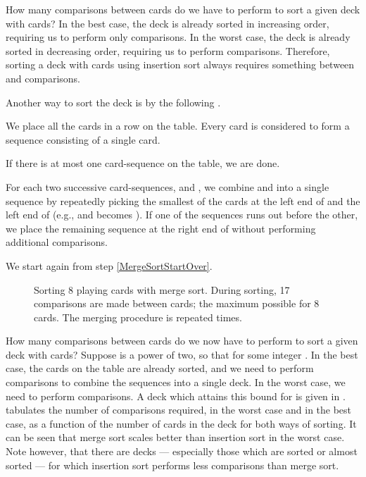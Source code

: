 \documentclass[b5paper, english, oneside]{memoir}
\begin{document}
How many comparisons between cards do we have to perform to sort a given deck with  cards? In the best case, the deck is already sorted in increasing order, requiring us to perform only  comparisons. In the worst case, the deck is already sorted in decreasing order, requiring us to perform  comparisons. Therefore, sorting a deck with  cards using insertion sort always requires something between  and  comparisons.

Another way to sort the deck is by the following .

\begin{enumbox}
\item We place all the cards in a row on the table. Every card  is considered to form a sequence  consisting of a single card.
\item \label{MergeSortStartOver} If there is at most one card-sequence on the table, we are done.
\item For each two successive card-sequences,  and , we combine  and  into a single sequence  by repeatedly picking the smallest of the cards at the left end of  and the left end of  (e.g.,  and  becomes ). If one of the sequences runs out before the other, we place the remaining sequence at the right end of  without performing additional comparisons.
\item We start again from step \ref{MergeSortStartOver}.
\end{enumbox}

\begin{figure}
\centering
\hfill{}\hfill\null

\hfill{}\hfill\null

\hfill{}\hfill\null

\hfill{}\hfill\null
\caption{Sorting 8 playing cards with merge sort. During sorting, 17 comparisons are made between cards; the maximum possible for 8 cards. The merging procedure is repeated  times.}
\label{MergeSortExample}
\end{figure}

How many comparisons between cards do we now have to perform to sort a given deck with  cards? Suppose  is a power of two, so that  for some integer . In the best case, the cards on the table are already sorted, and we need to perform  comparisons to combine the sequences into a single deck. In the worst case, we need to perform  comparisons. A deck which attains this bound for  is given in .  tabulates the number of comparisons required, in the worst case and in the best case, as a function of the number  of cards in the deck for both ways of sorting. It can be seen that merge sort scales better than insertion sort in the worst case. Note however, that there are decks --- especially those which are sorted or almost sorted --- for which insertion sort performs less comparisons than merge sort.
\end{document}

